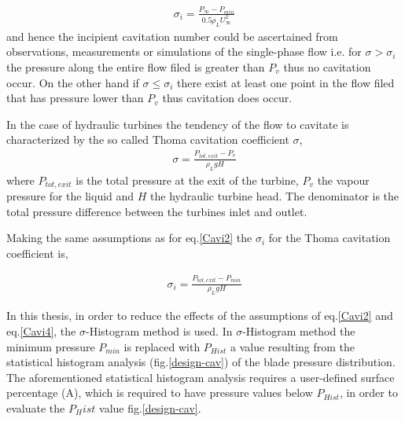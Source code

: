 \begin{eqnarray}
		\sigma_i=\frac{P_{\infty}-P_{min}}{0.5\rho_{L}U^2_{\infty}}
\label{Cavi2}
\end{eqnarray}
and hence the incipient cavitation number could be ascertained from observations, measurements or simulations of the single-phase flow i.e. for $\sigma > \sigma_i$ the pressure along the entire flow filed is greater than $P_v$ thus no cavitation occur. On the other hand if $\sigma \leq \sigma_i$ there exist at least one point in the flow filed that has pressure lower than $P_v$ thus cavitation does occur. 


In the case of hydraulic turbines the tendency of the flow to cavitate is characterized by the so called Thoma cavitation coefficient $\sigma$, 
\begin{eqnarray}
		\sigma=\frac{P_{tot,exit}-P_{v}}{\rho_{L}gH}
\label{Cavi3}
\end{eqnarray}
where $P_{tot,exit}$ is the total pressure at the exit of the turbine, $P_v$ the vapour pressure for the liquid and $H$ the hydraulic turbine head. The denominator is the total pressure difference between the turbines inlet and outlet.   

Making the same assumptions as for eq.\ref{Cavi2} the $\sigma_i$ for the Thoma cavitation coefficient  is, 

\begin{eqnarray}
		\sigma_i=\frac{P_{tot,exit}-P_{min}}{\rho_{L}gH}
\label{Cavi4}
\end{eqnarray}

In this thesis, in order to reduce the effects of the assumptions of eq.\ref{Cavi2} and eq.\ref{Cavi4}, the $\sigma$-Histogram method \cite{Schmidl} is used. In $\sigma$-Histogram method the minimum pressure $P_{min}$ is replaced with $P_{Hist}$  a value resulting from the statistical histogram analysis (fig.\ref{design-cav}) of the blade pressure distribution. The aforementioned statistical histogram analysis requires a user-defined surface percentage (A), which is required to have pressure values below $P_{Hist}$, in order to evaluate the $P_Hist$ value fig.\ref{design-cav}.  

